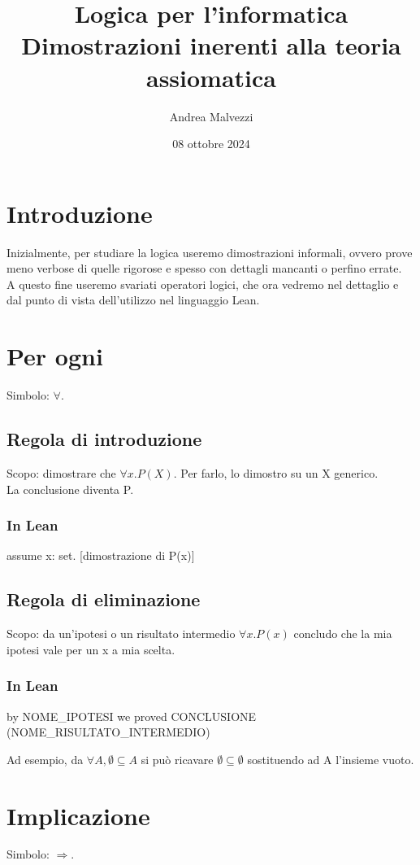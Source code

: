 \documentclass[12pt]{article}
\title{\textbf{Logica per l'informatica\\Dimostrazioni inerenti alla teoria assiomatica}}
\date{08 ottobre 2024}
\author{Andrea Malvezzi}
\begin{document}
\maketitle
\pagebreak
\tableofcontents
\pagebreak
\section{Introduzione}
Inizialmente, per studiare la logica useremo dimostrazioni informali, ovvero prove meno verbose di quelle rigorose e spesso con dettagli mancanti o perfino errate.\\
A questo fine useremo svariati operatori logici, che ora vedremo nel dettaglio e dal punto di vista dell'utilizzo nel linguaggio Lean.
\section{Per ogni }
Simbolo: $\forall$.
\subsection{Regola di introduzione}
Scopo: dimostrare che $\forall x. P(X)$. Per farlo, lo dimostro su un X generico.\\
La conclusione diventa P.
\subsubsection{In Lean}
\begin{center}
    assume x: set. [dimostrazione di P(x)]
\end{center}
\subsection{Regola di eliminazione}
Scopo: da un'ipotesi o un risultato intermedio $\forall x.P(x)$ concludo che la mia ipotesi vale per un x a mia scelta.
\subsubsection{In Lean}
\begin{center}
    by NOME\_IPOTESI we proved CONCLUSIONE (NOME\_RISULTATO\_INTERMEDIO)
\end{center}
Ad esempio, da $\forall A, \emptyset \subseteq A$ si può ricavare $\emptyset \subseteq \emptyset$ sostituendo ad A l'insieme vuoto.
\pagebreak
\section{Implicazione}
Simbolo: $\Rightarrow$.
\end{document}
